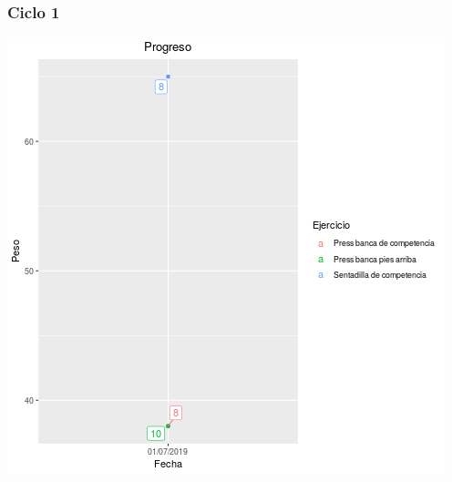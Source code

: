 \documentclass[11pt]{article}
\begin{document}
\subsubsection{Ciclo 1}
\label{sec:org016be64}
\begin{center}
\includegraphics[width=.9\linewidth]{tmp.png}
\end{center}
\end{document}
